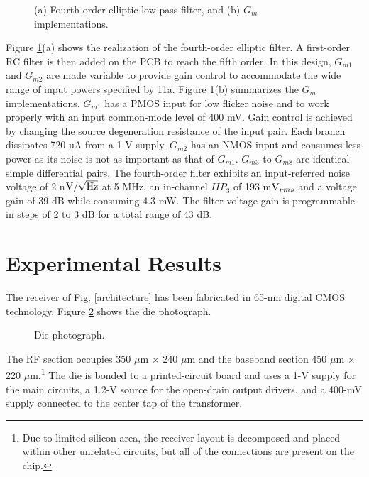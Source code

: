 \begin{figure}[htb]
\vspace{4in}
\caption{(a) Fourth-order elliptic low-pass filter, and (b) $G_m$ implementations.}
\label{filter}
\end{figure}
Figure \ref{filter}(a) shows the realization of the fourth-order elliptic filter.  A first-order RC filter is then added on the PCB to reach the
fifth order. In this design, $G_{m1}$ and $G_{m2}$ are made variable to provide gain control to accommodate the wide range of input powers specified
by 11a. Figure \ref{filter}(b) summarizes the $G_m$ implementations. $G_{m1}$ has a PMOS input for low flicker noise and to work
properly with an input common-mode level of 400 mV. Gain control is achieved by changing the source degeneration resistance of the input pair. Each
branch dissipates 720 uA from a 1-V supply.  $G_{m2}$ has an NMOS input and consumes less power as its noise is not as important as that of
$G_{m1}$. $G_{m3}$ to $G_{m8}$ are identical simple differential pairs.  The fourth-order filter exhibits an input-referred noise voltage of 2
n$\rm{V}/\sqrt{\rm{Hz}}$ at 5 MHz, an in-channel $IIP_3$ of 193 m${\rm{V}}_{rms}$ and a voltage gain of 39 dB while consuming 4.3 mW. The filter
voltage gain is programmable in steps of 2 to 3 dB for a total range of 43 dB.


\section{Experimental Results}
The receiver of Fig. \ref{architecture} has been fabricated in 65-nm digital CMOS technology. Figure \ref{die} shows the die photograph.
\begin{figure}[htb]
\vspace{1.025in}
\caption{Die photograph.}
\label{die}
\end{figure}
The RF section occupies 350 $\mu$m $\times$ 240 $\mu$m and the baseband section 450 $\mu$m $\times$ 220 $\mu$m.\footnote{Due to limited silicon area,
the receiver layout is decomposed and placed within other unrelated circuits, but all of the connections are present on the chip.}
The die is bonded to a printed-circuit board and uses a 1-V supply for the main circuits, a 1.2-V source for the open-drain output drivers, and a
400-mV supply connected to the center tap of the transformer.



